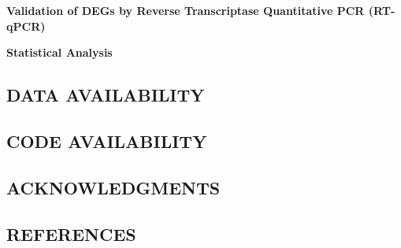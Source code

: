 \documentclass[
]{article}
\begin{document}
\textbf{Validation of DEGs by Reverse Transcriptase Quantitative PCR
(RT-qPCR)}

\textbf{Statistical Analysis} \newpage

\subsection{DATA AVAILABILITY}\label{data-availability}

\newpage

\subsection{CODE AVAILABILITY}\label{code-availability}

\newpage

\subsection{ACKNOWLEDGMENTS}\label{acknowledgments}

\newpage

\subsection{REFERENCES}\label{references}

\setlength{\parindent}{-0.25in}
\setlength{\leftskip}{0.25in}

\noindent
\end{document}
